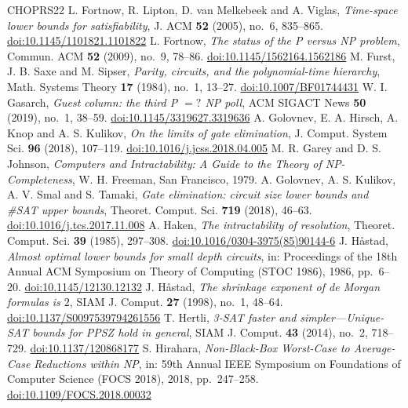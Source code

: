 \documentclass[11pt,reqno]{amsart}
\numberwithin{equation}{section}
\theoremstyle{plain}
\theoremstyle{definition}
\theoremstyle{remark}
\begin{document}
\begin{thebibliography}{CHOPRS22}
 L. Fortnow, R. Lipton, D. van Melkebeek and A. Viglas, \emph{Time-space lower bounds for satisfiability}, J. ACM \textbf{52} (2005), no.~6, 835--865. \href{https://doi.org/10.1145/1101821.1101822}{doi:10.1145/1101821.1101822}
 L. Fortnow, \emph{The status of the P versus NP problem}, Commun. ACM \textbf{52} (2009), no.~9, 78--86. \href{https://doi.org/10.1145/1562164.1562186}{doi:10.1145/1562164.1562186}
 M. Furst, J. B. Saxe and M. Sipser, \emph{Parity, circuits, and the polynomial-time hierarchy}, Math. Systems Theory \textbf{17} (1984), no.~1, 13--27. \href{https://doi.org/10.1007/BF01744431}{doi:10.1007/BF01744431}
 W. I. Gasarch, \emph{Guest column: the third P $=?$ NP poll}, ACM SIGACT News \textbf{50} (2019), no.~1, 38--59. \href{https://doi.org/10.1145/3319627.3319636}{doi:10.1145/3319627.3319636}
 A. Golovnev, E. A. Hirsch, A. Knop and A. S. Kulikov, \emph{On the limits of gate elimination}, J. Comput. System Sci. \textbf{96} (2018), 107--119. \href{https://doi.org/10.1016/j.jcss.2018.04.005}{doi:10.1016/j.jcss.2018.04.005}
 M. R. Garey and D. S. Johnson, \emph{Computers and Intractability: A Guide to the Theory of NP-Completeness}, W. H. Freeman, San Francisco, 1979.
 A. Golovnev, A. S. Kulikov, A. V. Smal and S. Tamaki, \emph{Gate elimination: circuit size lower bounds and \#SAT upper bounds}, Theoret. Comput. Sci. \textbf{719} (2018), 46--63. \href{https://doi.org/10.1016/j.tcs.2017.11.008}{doi:10.1016/j.tcs.2017.11.008}
 A. Haken, \emph{The intractability of resolution}, Theoret. Comput. Sci. \textbf{39} (1985), 297--308. \href{https://doi.org/10.1016/0304-3975(85)90144-6}{doi:10.1016/0304-3975(85)90144-6}
 J. H{\aa}stad, \emph{Almost optimal lower bounds for small depth circuits}, in: Proceedings of the 18th Annual ACM Symposium on Theory of Computing (STOC 1986), 1986, pp.~6--20. \href{https://doi.org/10.1145/12130.12132}{doi:10.1145/12130.12132}
 J. H{\aa}stad, \emph{The shrinkage exponent of de Morgan formulas is $2$}, SIAM J. Comput. \textbf{27} (1998), no.~1, 48--64. \href{https://doi.org/10.1137/S0097539794261556}{doi:10.1137/S0097539794261556}
 T. Hertli, \emph{3-SAT faster and simpler---Unique-SAT bounds for PPSZ hold in general}, SIAM J. Comput. \textbf{43} (2014), no.~2, 718--729. \href{https://doi.org/10.1137/120868177}{doi:10.1137/120868177}
 S. Hirahara, \emph{Non-Black-Box Worst-Case to Average-Case Reductions within NP}, in: 59th Annual IEEE Symposium on Foundations of Computer Science (FOCS 2018), 2018, pp.~247--258. \href{https://doi.org/10.1109/FOCS.2018.00032}{doi:10.1109/FOCS.2018.00032}

\end{thebibliography}
\end{document}
